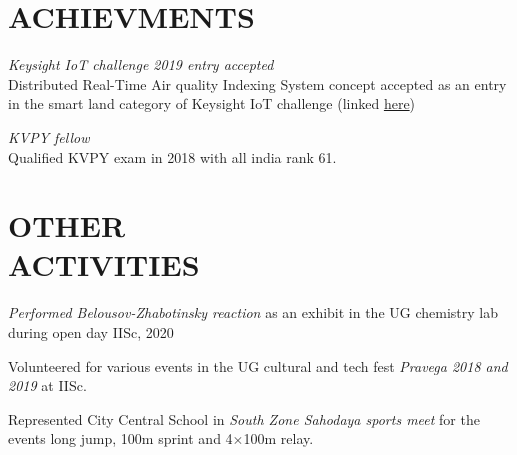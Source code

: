 \documentclass[margin, 10pt]{res} %
\begin{document}
\begin{resume}

\section{ACHIEVMENTS}

{\sl Keysight IoT challenge 2019 entry accepted}\\
Distributed Real-Time Air quality Indexing System concept accepted
as an entry in the smart land category of Keysight IoT challenge (linked \href{https://www.iotchallengekeysight.com/2019/entries/smart-land/41-0413-102730-draqis-distributed-real-time-air-quality-indexing-system}{here})

{\sl KVPY fellow}\\
Qualified KVPY exam in 2018 with all india rank 61.



\section{OTHER \\ ACTIVITIES} 
{\it Performed Belousov-Zhabotinsky reaction} as an exhibit in the UG chemistry lab during open day IISc, 2020
\smallskip

Volunteered for various events in the UG cultural and tech fest {\it Pravega 2018 and 2019} at IISc.
\smallskip

Represented City Central School in {\it South Zone Sahodaya sports meet} for the events
long jump, 100m sprint and 4$\times$100m relay.


\end{resume}
\end{document}
